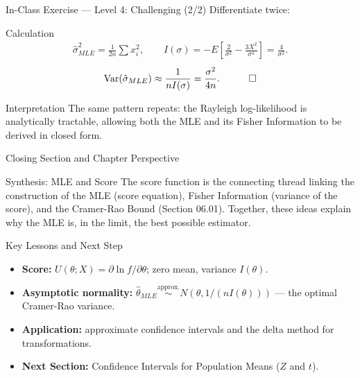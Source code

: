 \documentclass[aspectratio=169,xcolor={dvipsnames,table}]{beamer}
\begin{document}
\begin{frame}{In-Class Exercise --- Level 4: Challenging (2/2)}
	\vspace{-0.05cm}
	\scriptsize
	Differentiate twice: \pause
	\begin{block}{Calculation}
		\scriptsize
		\begin{align*}
			\hat\sigma^2_{MLE} = \frac{1}{2n}\sum x_i^2, \qquad I(\sigma) = -E\left[\frac{2}{\sigma^2}-\frac{3X^2}{\sigma^4}\right] = \frac{4}{\sigma^2}.
		\end{align*}
		\begin{align*}
			\operatorname{Var}(\hat\sigma_{MLE}) \approx \frac{1}{nI(\sigma)} = \frac{\sigma^2}{4n}. \quad \qedhere
		\end{align*}
	\end{block}
	\vspace{0.05cm}
	\pause
	\begin{alertblock}{Interpretation}
		\scriptsize
		The same pattern repeats: the Rayleigh log-likelihood is analytically tractable, allowing both the MLE and its Fisher Information to be derived in closed form.
	\end{alertblock}
\end{frame}

\begin{frame}{Closing Section and Chapter Perspective}
	\vspace{-0.2cm}
	\begin{block}{Synthesis: MLE and Score}
		\scriptsize
		The score function is the connecting thread linking the construction of the MLE (score equation), Fisher Information (variance of the score), and the Cramer-Rao Bound (Section 06.01). Together, these ideas explain why the MLE is, in the limit, the best possible estimator.
	\end{block}
	\vspace{0.05cm}
	\pause
	\begin{alertblock}{Key Lessons and Next Step}
		\begin{itemize}\itemsep=0.05cm
			\item \textbf{Score:} $U(\theta;X)=\partial\ln f/\partial\theta$; zero mean, variance $I(\theta)$.
			\item \textbf{Asymptotic normality:} $\hat\theta_{MLE} \overset{\text{approx.}}{\sim} N(\theta, 1/(nI(\theta)))$ --- the optimal Cramer-Rao variance.
			\item \textbf{Application:} approximate confidence intervals and the delta method for transformations.
			\item \textbf{Next Section:} \textcolor{TecRojo}{Confidence Intervals for Population Means ($Z$ and $t$)}.
		\end{itemize}
	\end{alertblock}
\end{frame}
\end{document}
